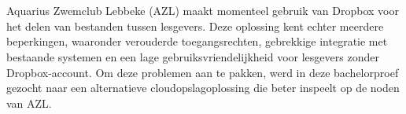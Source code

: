 
%
%
%
%
%

%



\chapter*{}

Aquarius Zwemclub Lebbeke (AZL) maakt momenteel gebruik van Dropbox voor het delen van bestanden tussen lesgevers. Deze oplossing kent echter meerdere beperkingen, 
waaronder verouderde toegangsrechten, gebrekkige integratie met bestaande systemen en een lage gebruiksvriendelijkheid voor lesgevers zonder Dropbox-account. 
Om deze problemen aan te pakken, werd in deze bachelorproef gezocht naar een alternatieve cloudopslagoplossing die beter inspeelt op de noden van AZL.

